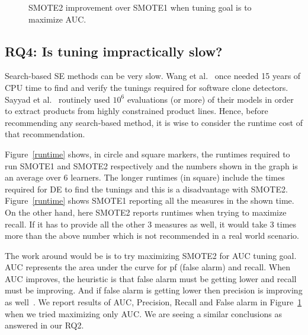\begin{figure}[!htbp]
    \caption{SMOTE2 improvement over SMOTE1 when tuning goal is to maximize AUC.}
    \vspace{-10pt}
    \label{fig:auc}
\vspace{-0.6cm}
\end{figure} 

\subsection{\textbf{RQ4: Is tuning impractically slow?}}

Search-based SE methods can be very slow. Wang et al.~\cite{wang2013searching} once needed 15
years of CPU time to find and verify the tunings required for software
clone detectors. Sayyad et al.~\cite{sayyad2013scalable} routinely used
$10^6$ evaluations (or more) of their models in order to extract
products from highly constrained product
lines. Hence, before recommending any
search-based method, it is wise to consider the runtime cost of that
recommendation.


 Figure~\ref{runtime} shows,  in circle and square markers, the
  runtimes required to run SMOTE1 and SMOTE2 respectively and the numbers shown in the graph is an average over 6 learners.  The
  longer runtimes (in square) include the times required for DE to find
  the tunings and this is a disadvantage with SMOTE2. Figure~\ref{runtime} shows SMOTE1 reporting all the measures in the shown time. On the other hand, here SMOTE2 reports runtimes when trying to maximize recall. If it has to provide all the other 3 measures as well, it would take 3 times more than the above number which is not recommended in a real world scenario. 
  
  The work around would be is to try maximizing SMOTE2 for AUC tuning goal. AUC represents the area under the curve for pf (false alarm) and recall. When AUC improves, the heuristic is that false alarm must be getting lower and recall must be improving. And if false alarm is getting lower then precision is improving as well~\cite{menzies2007data}. We report results of AUC, Precision, Recall and False alarm in Figure~\ref{fig:auc} when we tried maximizing only AUC. We are seeing a similar conclusions as answered in our RQ2. 
  
